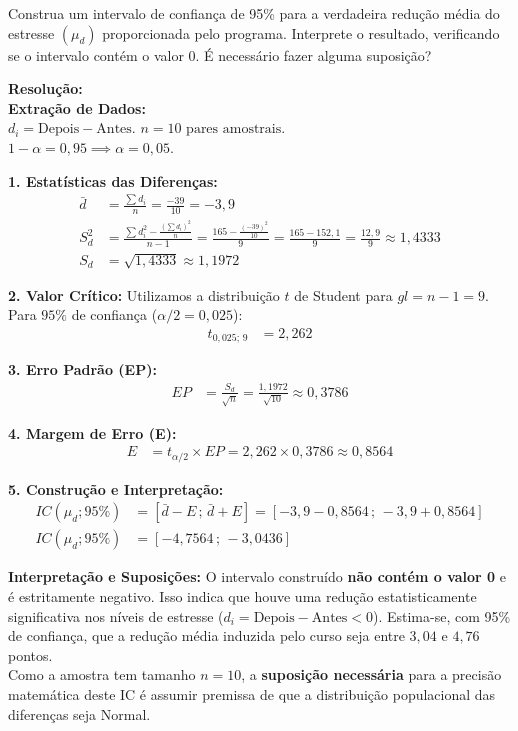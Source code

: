 \documentclass[12pt, a4paper]{article}
\begin{document}
\medskip\noindent Construa um intervalo de confiança de 95\% para a verdadeira redução média do estresse $(\mu_d)$ proporcionada pelo programa. Interprete o resultado, verificando se o intervalo contém o valor 0. É necessário fazer alguma suposição?

\vspace{0.3cm}
\noindent\textbf{Resolução:} \\
\textbf{Extração de Dados:} \\
$d_i = \text{Depois} - \text{Antes}$. $n = 10 \text{ pares amostrais}$. \\
$1-\alpha = 0{,}95 \implies \alpha = 0{,}05$.

\noindent \textbf{1. Estatísticas das Diferenças:}
\begin{align*}
\bar{d} &= \frac{\sum d_i}{n} = \frac{-39}{10} = \boxed{-3{,}9} \\
S^2_d &= \frac{\sum d_i^2 - \frac{(\sum d_i)^2}{n}}{n-1} = \frac{165 - \frac{(-39)^2}{10}}{9} = \frac{165 - 152{,}1}{9} = \frac{12{,}9}{9} \approx \boxed{1{,}4333} \\
S_d &= \sqrt{1{,}4333} \approx \boxed{1{,}1972}
\end{align*}

\noindent \textbf{2. Valor Crítico:}
Utilizamos a distribuição $t$ de Student para $gl = n - 1 = 9$. Para $95\%$ de confiança ($\alpha/2 = 0{,}025$):
\begin{align*}
t_{0{,}025; \, 9} &= \boxed{2{,}262}
\end{align*}

\noindent \textbf{3. Erro Padrão (EP):}
\begin{align*}
EP &= \frac{S_d}{\sqrt{n}} = \frac{1{,}1972}{\sqrt{10}} \approx \boxed{0{,}3786}
\end{align*}

\noindent \textbf{4. Margem de Erro (E):}
\begin{align*}
E &= t_{\alpha/2} \times EP = 2{,}262 \times 0{,}3786 \approx \boxed{0{,}8564}
\end{align*}

\noindent \textbf{5. Construção e Interpretação:}
\begin{align*}
IC(\mu_d; 95\%) &= [\bar{d} - E \,;\, \bar{d} + E] = [-3{,}9 - 0{,}8564 \,;\, -3{,}9 + 0{,}8564] \\
IC(\mu_d; 95\%) &= \boxed{[-4{,}7564 \,;\, -3{,}0436]}
\end{align*}

\noindent \textbf{Interpretação e Suposições:} O intervalo construído \textbf{não contém o valor 0} e é estritamente negativo. Isso indica que houve uma redução estatisticamente significativa nos níveis de estresse ($d_i = \text{Depois} - \text{Antes} < 0$). Estima-se, com 95\% de confiança, que a redução média induzida pelo curso seja entre $3{,}04$ e $4{,}76$ pontos. \\
Como a amostra tem tamanho $n=10$, a \textbf{suposição necessária} para a precisão matemática deste IC é assumir premissa de que a distribuição populacional das diferenças seja Normal.
\end{document}
